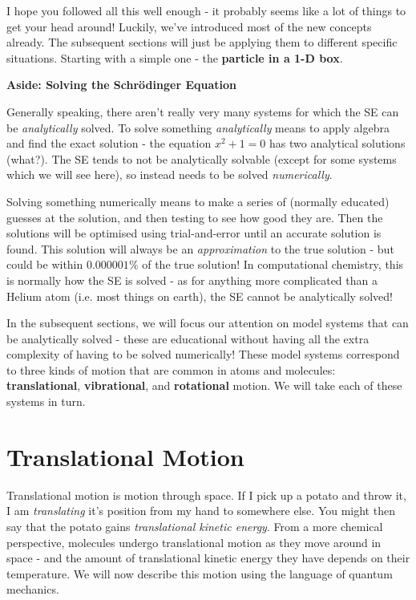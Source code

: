 \documentclass{memoir}[11pt,oneside,a4paper,openany]
\begin{document}
I hope you followed all this well enough - it probably seems like a lot of things to get your head around! Luckily, we've introduced most of the new concepts already. The subsequent sections will just be applying them to different specific situations. Starting with a simple one - the \textbf{particle in a 1-D box}.
\newpage
\begin{vplace}
	\begin{center}\textbf{\Large{Aside: Solving the Schr{\"o}dinger Equation}}\end{center}
Generally speaking, there aren't really very many systems for which the SE can be \emph{analytically} solved. To solve something \emph{analytically} means to apply algebra and find the exact solution - the equation $x^2 + 1 = 0$ has two analytical solutions (what?). The SE tends to not be analytically solvable (except for some systems which we will see here), so instead needs to be solved \emph{numerically}. 

	Solving something numerically means to make a series of (normally educated) guesses at the solution, and then testing to see how good they are. Then the solutions will be optimised using trial-and-error until an accurate solution is found. This solution will always be an \emph{approximation} to the true solution - but could be within $0.000001\%$ of the true solution! In computational chemistry, this is normally how the SE is solved - as for anything more complicated than a Helium atom (i.e. most things on earth), the SE cannot be analytically solved! 

In the subsequent sections, we will focus our attention on model systems that can be analytically solved - these are educational without having all the extra complexity of having to be solved numerically! These model systems correspond to three kinds of motion that are common in atoms and molecules: \textbf{translational}, \textbf{vibrational}, and \textbf{rotational} motion. We will take each of these systems in turn.  
\end{vplace}
\chapter{Translational Motion}
Translational motion is motion through space. If I pick up a potato and throw it, I am \emph{translating} it's position from my hand to somewhere else. You might then say that the potato gains \emph{translational kinetic energy}. From a more chemical perspective, molecules undergo translational motion as they move around in space - and the amount of translational kinetic energy they have depends on their temperature. We will now describe this motion using the language of quantum mechanics.
\end{document}
